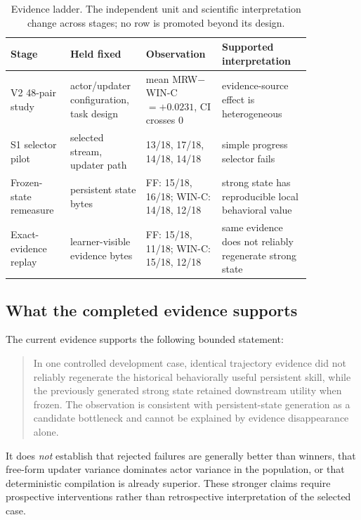 \begin{table}[t]
\centering
\caption{Evidence ladder. The independent unit and scientific interpretation change across stages; no row is promoted beyond its design.}
\label{tab:evidence-ladder}
\small
\setlength{\tabcolsep}{3pt}
\begin{tabular}{p{0.18\linewidth}p{0.18\linewidth}p{0.22\linewidth}p{0.27\linewidth}}
\toprule
Stage & Held fixed & Observation & Supported interpretation \\
\midrule
V2 48-pair study & actor/updater configuration, task design & mean MRW$-$WIN-C $=+0.0231$, CI crosses 0 & evidence-source effect is heterogeneous \\
S1 selector pilot & selected stream, updater path & 13/18, 17/18, 14/18, 14/18 & simple progress selector fails \\
Frozen-state remeasure & persistent state bytes & FF: 15/18, 16/18; WIN-C: 14/18, 12/18 & strong state has reproducible local behavioral value \\
Exact-evidence replay & learner-visible evidence bytes & FF: 15/18, 11/18; WIN-C: 15/18, 12/18 & same evidence does not reliably regenerate strong state \\
\bottomrule
\end{tabular}
\end{table}

\subsection{What the completed evidence supports}
The current evidence supports the following bounded statement:

\begin{quote}
In one controlled development case, identical trajectory evidence did not reliably regenerate the historical behaviorally useful persistent skill, while the previously generated strong state retained downstream utility when frozen. The observation is consistent with persistent-state generation as a candidate bottleneck and cannot be explained by evidence disappearance alone.
\end{quote}

It does \emph{not} establish that rejected failures are generally better than winners, that free-form updater variance dominates actor variance in the population, or that deterministic compilation is already superior. These stronger claims require prospective interventions rather than retrospective interpretation of the selected case.
